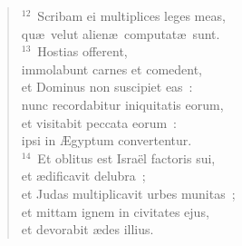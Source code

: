 \begin{verse}
${}^{12}$~Scribam ei multiplices leges meas,\\ qu\ae\ velut alien\ae\ computat\ae\ sunt.\\
${}^{13}$~Hostias offerent,\\ immolabunt carnes et comedent,\\ et Dominus non suscipiet eas~:\\ nunc recordabitur iniquitatis eorum,\\ et visitabit peccata eorum~:\\ ipsi in \AE gyptum convertentur.\\
${}^{14}$~Et oblitus est Isra\"el factoris sui,\\ et \ae dificavit delubra~;\\ et Judas multiplicavit urbes munitas~;\\ et mittam ignem in civitates ejus,\\ et devorabit \ae des illius.\end{verse}


